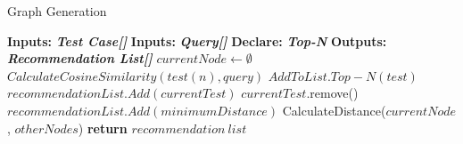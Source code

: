 \begin{algorithm}[!b]
	\vspace*{3pt}
	\caption{Graph Generation}\label{alg:ReAlg}
	\begin{algorithmic}[1]
		{\footnotesize
			\State \textbf{Inputs:} \textbf{ \textit{Test Case[]}} 
			\State \textbf{Inputs:} \textbf{ \textit{Query[]}} 
			\State \textbf{Declare:} \textbf{ \textit{Top-N}} 
			\State \textbf{Outputs:} \textbf{ \textit{Recommendation List[]}} 
			\State $currentNode \gets \emptyset $
			\State $Calculate Cosine Similarity(test(n), query)$
			\State $AddToList.Top-N(test)$		
			\State $recommendationList.Add(currentTest)$
			\State $currentTest$.remove()
			\State $recommendationList.Add(minimumDistance)$
			\State CalculateDistance($currentNode$, $otherNodes$)
			\EndIf
			\EndFor			
			\EndWhile\label{mainPathWhile}
			\State \textbf{return} $recommendation \: list$
			\EndProcedure
		}
	\end{algorithmic}
\end{algorithm}






